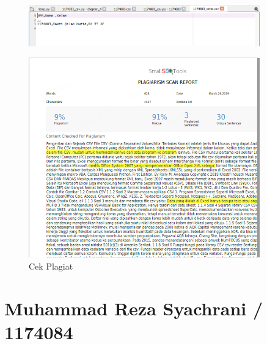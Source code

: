 \begin{figure}[H]
	\includegraphics[width=10cm]{figures/4/1174083/Teori/kode_teori_3.png}
	\centering
\end{figure}

\begin{figure}[H]
	\includegraphics[width=10cm]{figures/4/1174083/Teori/plagiarisme.png}
	\centering	
	\caption{Cek Plagiat}
\end{figure}


\section{Muhammad Reza Syachrani / 1174084}
